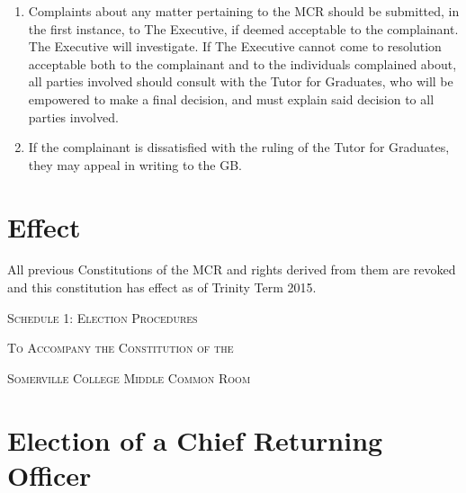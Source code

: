 \documentclass[11pt, a4paper]{article}
\begin{document}
\begin{enumerate}
	\item Complaints about any matter pertaining to the MCR should be submitted, in the first instance, to The Executive, if deemed acceptable to the complainant. The Executive will investigate. If The Executive cannot come to resolution acceptable both to the complainant and to the individuals complained about, all parties involved should consult with the Tutor for Graduates, who will be empowered to make a final decision, and must explain said decision to all parties involved.
    \item If the complainant is dissatisfied with the ruling of the Tutor for Graduates, they may appeal in writing to the GB.
\end{enumerate}





\section{Effect}
\label{sec:effect}

All previous Constitutions of the MCR and rights derived from them are revoked and this constitution has effect as of Trinity Term 2015.





\clearpage
\setcounter{section}{0}





\centerline{{\Huge \textsc{Schedule 1: Election Procedures}}}
\vspace{2mm}
\centerline{{\Large \textsc{To Accompany the Constitution of the}}}
\vspace{2mm}
\centerline{{\Large \textsc{Somerville College Middle Common Room}}}





\section{Election of a Chief Returning Officer}
\label{sec:cro}
\end{document}

